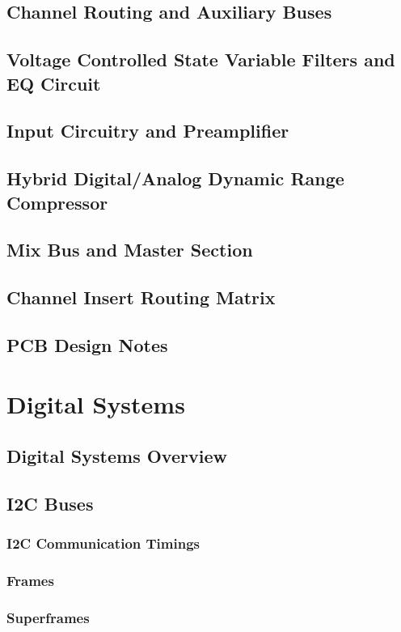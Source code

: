 \documentclass[11pt, letterpaper,titlepage]{article}
\begin{document}
\subsection{Channel Routing and Auxiliary Buses}
\subsection{Voltage Controlled State Variable Filters and EQ Circuit}
\subsection{Input Circuitry and Preamplifier}
\subsection{Hybrid Digital/Analog Dynamic Range Compressor}
\subsection{Mix Bus and Master Section}
\subsection{Channel Insert Routing Matrix}
\subsection{PCB Design Notes}

\newpage
\section{Digital Systems}

\subsection{Digital Systems Overview}
\subsection{I2C Buses}
\subsubsection{I2C Communication Timings}
\subsubsection{Frames}
\subsubsection{Superframes}
\end{document}

